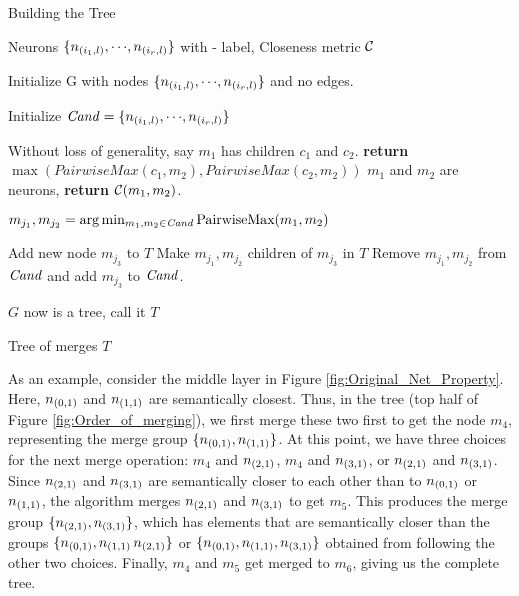 \begin{algorithm}
\caption{Building the Tree}
\label{a:build-tree}
\begin{algorithmic}[1]

    \Require Neurons $\{n_{(i_1,l)}, {\cdots}, n_{(i_r,l)}\}$ with \inc-\dec
    label, Closeness metric $\mathcal{C}$

    
    \State Initialize G with nodes $\{ n_{(i_1,l)}, {\cdots}, n_{(i_r,l)} \}$
    and no edges. \label{a:build-tree:init}

    \State Initialize $\mathit{Cand}=\{ n_{(i_1,l)}, {\cdots}, n_{(i_r,l)} \}$
    \label{a:build-tree:init-cand}

     \label{a:build-tree:fn-start}
        
            \State Without loss of generality, say $m_1$ has children $c_1$ and
            $c_2$. 
            \State \textbf{return} $\max( PairwiseMax( c_1, m_2 ), PairwiseMax(
            c_2, m_2 ) )$
        \Else
            \State $m_1$ and $m_2$ are neurons, \textbf{return} $\mathcal{C}( m_1, m_2 )$.
        \EndIf

    \EndFunction \label{a:build-tree:fn-end}

     \label{a:build-tree:loop}
    
        \State $m_{j_1}, m_{j_2} = \arg\min_{\substack{m_1, m_2 \in \mathit{Cand}}} 
            \text{PairwiseMax}(m_1, m_2)$ \label{a:build-tree:get-mij}

        \State Add new node $m_{j_3}$ to $T$ \label{a:build-tree:merge-start}
        \State Make $m_{j_1}, m_{j_2}$ children of $m_{j_3}$ in $T$
        \State Remove $m_{j_1}, m_{j_2}$ from $\mathit{Cand}$ and add $m_{j_3}$ to
        $\mathit{Cand}$.
            \label{a:build-tree:merge-end}
    \EndWhile

    \State $G$ now is a tree, call it $T$

    \Ensure Tree of merges $T$
\end{algorithmic}
\end{algorithm}

As an example, consider the middle layer in Figure
\ref{fig:Original_Net_Property}. Here, $n_{(0,1)}$ and $n_{(1,1)}$ are
semantically closest. Thus, in the tree (top half of Figure
\ref{fig:Order_of_merging}), we first merge these two first to get the
node $m_4$, representing the merge group $\{n_{(0,1)}, n_{(1,1)}\}$. At this
point, we have three choices for the next merge operation: $m_4$ and
$n_{(2,1)}$, $m_4$ and $n_{(3,1)}$, or $n_{(2,1)}$ and $n_{(3,1)}$. Since
$n_{(2,1)}$ and $n_{(3,1)}$ are semantically closer to each other than to
$n_{(0,1)}$ or $n_{(1,1)}$, the algorithm merges
$n_{(2,1)}$ and $n_{(3,1)}$ to get $m_5$. This produces the merge group
$\{n_{(2,1)}, n_{(3,1)}\}$, which has elements that are semantically closer than
the groups $\{n_{(0,1)}, n_{(1,1)}\, n_{(2,1)}\}$ or $\{n_{(0,1)}, n_{(1,1)},
n_{(3,1)} \}$ obtained from following the other two choices. 
Finally, $m_4$ and $m_5$ get merged to $m_6$, giving us the complete tree.

